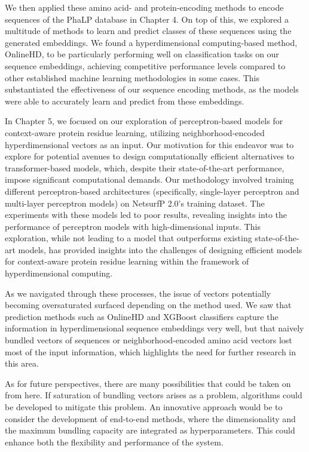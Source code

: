 We then applied these amino acid- and protein-encoding methods to encode sequences of the PhaLP database in Chapter 4. On top of this, we explored a multitude of methods to learn and predict classes of these sequences using the generated embeddings. We found a hyperdimensional computing-based method, OnlineHD, to be particularly performing well on classification tasks on our sequence embeddings, achieving competitive performance levels compared to other established machine learning methodologies in some cases. This substantiated the effectiveness of our sequence encoding methods, as the models were able to accurately learn and predict from these embeddings.

In Chapter 5, we focused on our exploration of perceptron-based models for context-aware protein residue learning, utilizing neighborhood-encoded hyperdimensional vectors as an input. Our motivation for this endeavor was to explore for potential avenues to design computationally efficient alternatives to transformer-based models, which, despite their state-of-the-art performance, impose significant computational demands. Our methodology involved training different perceptron-based architectures (specifically, single-layer perceptron and multi-layer perceptron models) on NetsurfP 2.0's training dataset. The experiments with these models led to poor results, revealing insights into the performance of perceptron models with high-dimensional inputs. This exploration, while not leading to a model that outperforms existing state-of-the-art models, has provided insights into the challenges of designing efficient models for context-aware protein residue learning within the framework of hyperdimensional computing.

As we navigated through these processes, the issue of vectors potentially becoming oversaturated surfaced depending on the method used. We saw that prediction methods such as OnlineHD and XGBoost classifiers capture the information in hyperdimensional sequence embeddings very well, but that naively bundled vectors of sequences or neighborhood-encoded amino acid vectors lost most of the input information, which highlights the need for further research in this area.

As for future perspectives, there are many possibilities that could be taken on from here. If saturation of bundling vectors arises as a problem, algorithms could be developed to mitigate this problem. An innovative approach would be to consider the development of end-to-end methods, where the dimensionality and the maximum bundling capacity are integrated as hyperparameters. This could enhance both the flexibility and performance of the system.

